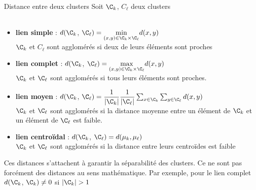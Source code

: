 \documentclass[10pt]{beamer}
\newcommand{\ex}{{\color{MPTblue}\ding{228}}}
\newcommand{\hsp}{\hspace*{1em}}
\begin{document}
\begin{frame}{Distance entre deux clusters}	
	\vspace*{-0.7em}
	Soit $\C_k$, $C_\ell$ deux clusters\\[0.3em]
	
	 \\[0.3em]	
	\begin{itemize}
		\item[\ex] \textbf{lien simple} : $d(\C_k$, $\C_\ell) = \underset{(x,y) \in \C_k \times \C_\ell}{\min} d(x,y)$\\[0.1em]
		$ \C_k$ et $C_\ell$ sont agglomérés si deux de leurs éléments sont proches\\[1em]
		\item[\ex] \textbf{lien complet} : $d(\C_k$, $\C_\ell) = \underset{(x,y) \in \C_k \times \C_\ell}{\max} d(x,y)$\\[0.1em]
		$ \C_k$ et $\C_\ell$ sont agglomérés si tous leurs éléments sont proches.\\[1em]
		\item[\ex] \textbf{lien moyen} : $d(\C_k$, $\C_\ell) = \dfrac{1}{\vert\C_k\vert}\dfrac{1}{\vert\C_\ell\vert}\sum_{x\in \C_k} \sum_{y \in \C_\ell} d(x,y)$\\[0.1em]
		$ \C_k$ et $\C_\ell$ sont agglomérés si la distance moyenne entre un élément de $ \C_k$ et un élément de $\C_\ell$ est faible.\\[1em]
		\item[\ex] \textbf{lien centroïdal} : $d(\C_k$, $\C_\ell) =  d(\mu_k, \mu_\ell)$\\[0.1em]
		$ \C_k$ et $\C_\ell$ sont agglomérés si la distance entre leurs centroïdes est faible\\[1em]
	\end{itemize}
 \hsp Ces distances s’attachent à garantir la séparabilité des clusters. Ce ne sont pas forcément des distances au sens mathématique. Par exemple, pour le lien complet $d(\C_k$, $\C_k) \neq 0$ si $|\C_k| >1$
\end{frame}
\end{document}
